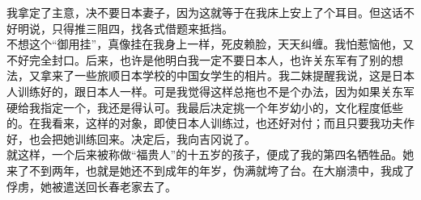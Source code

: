 我拿定了主意，决不要日本妻子，因为这就等于在我床上安上了个耳目。但这话不好明说，只得推三阻四，找各式借题来抵挡。\\

不想这个“御用挂”，真像挂在我身上一样，死皮赖脸，天天纠缠。我怕惹恼他，又不好完全封口。后来，也许是他明白我一定不要日本人，也许关东军有了别的想法，又拿来了一些旅顺日本学校的中国女学生的相片。我二妹提醒我说，这是日本人训练好的，跟日本人一样。可是我觉得这样总拖也不是个办法，因为如果关东军硬给我指定一个，我还是得认可。我最后决定挑一个年岁幼小的，文化程度低些的。在我看来，这样的对象，即使日本人训练过，也还好对付；而且只要我功夫作好，也会把她训练回来。决定后，我向吉冈说了。\\

就这样，一个后来被称做“福贵人”的十五岁的孩子，便成了我的第四名牺牲品。她来了不到两年，也就是她还不到成年的年岁，伪满就垮了台。在大崩溃中，我成了俘虏，她被遣送回长春老家去了。\\